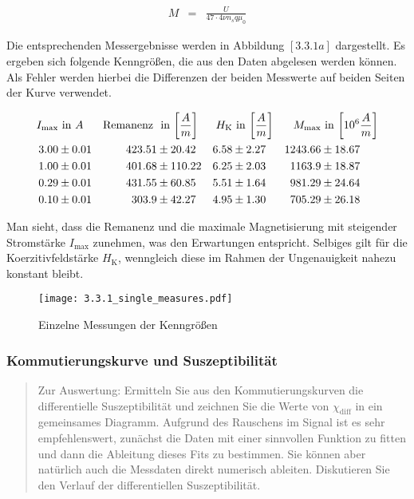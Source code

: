 \documentclass[12pt,a4paper]{scrartcl}
\numberwithin{equation}{section} %
\renewcommand{\[}{} %
\renewcommand{\]}{\noindent} %
\begin{document}
\[
\begin{eqnarray}
    M &=&
        \frac{U}{47\cdot 4\nu n_s q \mu_0}
        \label{M}
\end{eqnarray}
\]

Die entsprechenden Messergebnisse werden in Abbildung \([3.3.1a]\)
dargestellt. Es ergeben sich folgende Kenngrößen, die aus den Daten
abgelesen werden können. Als Fehler werden hierbei die Differenzen der
beiden Messwerte auf beiden Seiten der Kurve verwendet.

\[
\begin{align*}
    I_\mathrm{max} &\text{ in } A &
        \text{Remanenz } &\text{ in }
            {\tiny \left[ \frac{A}{m} \right] } &
        H_\mathrm{K} &\text{ in }
            {\tiny \left[ \frac{A}{m} \right] } &
        M_\mathrm{max} &\text{ in }
            {\tiny \left[10^6 \frac{A}{m} \right] }
        \\
    3.00 &\pm 0.01 &
        423.51 &\pm 20.42 &
        6.58 &\pm 2.27 &
        1243.66 &\pm 18.67
        \\
    1.00 &\pm 0.01 &
        401.68 &\pm 110.22 &
        6.25 &\pm 2.03 &
        1163.9 &\pm 18.87
        \\
    0.29 &\pm 0.01 &
        431.55 &\pm 60.85 &
        5.51 &\pm 1.64 &
        981.29 &\pm 24.64
        \\
    0.10 &\pm 0.01 &
        303.9 &\pm 42.27 &
        4.95 &\pm 1.30 &
        705.29 &\pm 26.18
        \\
\end{align*}
\]

Man sieht, dass die Remanenz und die maximale Magnetisierung mit
steigender Stromstärke \(I_\mathrm{max}\) zunehmen, was den Erwartungen
entspricht. Selbiges gilt für die Koerzitivfeldstärke \(H_\mathrm{K}\),
wenngleich diese im Rahmen der Ungenauigkeit nahezu konstant bleibt.

\begin{figure}
\centering
\texttt{[image: 3.3.1\_single\_measures.pdf]}
\caption{Einzelne Messungen der Kenngrößen}
\end{figure}

\hypertarget{kommutierungskurve-und-suszeptibilituxe4t}{%
\subsubsection{Kommutierungskurve und
Suszeptibilität}\label{kommutierungskurve-und-suszeptibilituxe4t}}

\begin{quote}
Zur Auswertung: Ermitteln Sie aus den Kommutierungskurven die
differentielle Suszeptibilität und zeichnen Sie die Werte von
\(\chi_\mathrm{diff}\) in ein gemeinsames Diagramm. Aufgrund des
Rauschens im Signal ist es sehr empfehlenswert, zunächst die Daten mit
einer sinnvollen Funktion zu fitten und dann die Ableitung dieses Fits
zu bestimmen. Sie können aber natürlich auch die Messdaten direkt
numerisch ableiten. Diskutieren Sie den Verlauf der differentiellen
Suszeptibilität.
\end{quote}
\end{document}
